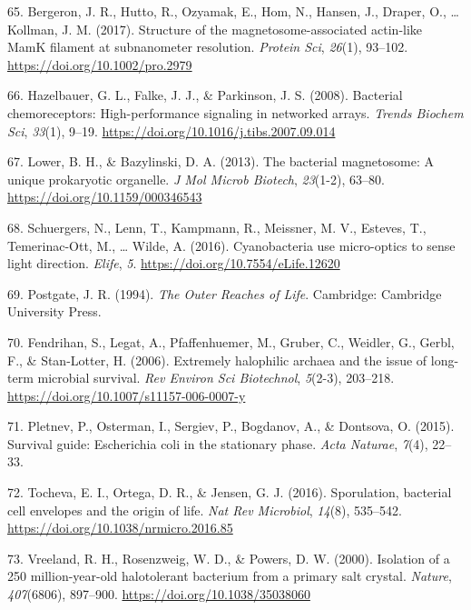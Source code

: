 \documentclass[]{tufte-book}
\begin{document}
\leavevmode\hypertarget{ref-bergeron2017}{}%
65. Bergeron, J. R., Hutto, R., Ozyamak, E., Hom, N., Hansen, J., Draper, O., \ldots{} Kollman, J. M. (2017). Structure of the magnetosome-associated actin-like MamK filament at subnanometer resolution. \emph{Protein Sci}, \emph{26}(1), 93--102. \url{https://doi.org/10.1002/pro.2979}

\leavevmode\hypertarget{ref-hazelbauer2008}{}%
66. Hazelbauer, G. L., Falke, J. J., \& Parkinson, J. S. (2008). Bacterial chemoreceptors: High-performance signaling in networked arrays. \emph{Trends Biochem Sci}, \emph{33}(1), 9--19. \url{https://doi.org/10.1016/j.tibs.2007.09.014}

\leavevmode\hypertarget{ref-lower2013}{}%
67. Lower, B. H., \& Bazylinski, D. A. (2013). The bacterial magnetosome: A unique prokaryotic organelle. \emph{J Mol Microb Biotech}, \emph{23}(1-2), 63--80. \url{https://doi.org/10.1159/000346543}

\leavevmode\hypertarget{ref-schuergers2016}{}%
68. Schuergers, N., Lenn, T., Kampmann, R., Meissner, M. V., Esteves, T., Temerinac-Ott, M., \ldots{} Wilde, A. (2016). Cyanobacteria use micro-optics to sense light direction. \emph{Elife}, \emph{5}. \url{https://doi.org/10.7554/eLife.12620}

\leavevmode\hypertarget{ref-postgate1994}{}%
69. Postgate, J. R. (1994). \emph{The Outer Reaches of Life}. Cambridge: Cambridge University Press.

\leavevmode\hypertarget{ref-fendrihan2006}{}%
70. Fendrihan, S., Legat, A., Pfaffenhuemer, M., Gruber, C., Weidler, G., Gerbl, F., \& Stan-Lotter, H. (2006). Extremely halophilic archaea and the issue of long-term microbial survival. \emph{Rev Environ Sci Biotechnol}, \emph{5}(2-3), 203--218. \url{https://doi.org/10.1007/s11157-006-0007-y}

\leavevmode\hypertarget{ref-pletnev2015}{}%
71. Pletnev, P., Osterman, I., Sergiev, P., Bogdanov, A., \& Dontsova, O. (2015). Survival guide: Escherichia coli in the stationary phase. \emph{Acta Naturae}, \emph{7}(4), 22--33.

\leavevmode\hypertarget{ref-tocheva2016}{}%
72. Tocheva, E. I., Ortega, D. R., \& Jensen, G. J. (2016). Sporulation, bacterial cell envelopes and the origin of life. \emph{Nat Rev Microbiol}, \emph{14}(8), 535--542. \url{https://doi.org/10.1038/nrmicro.2016.85}

\leavevmode\hypertarget{ref-vreeland2000}{}%
73. Vreeland, R. H., Rosenzweig, W. D., \& Powers, D. W. (2000). Isolation of a 250 million-year-old halotolerant bacterium from a primary salt crystal. \emph{Nature}, \emph{407}(6806), 897--900. \url{https://doi.org/10.1038/35038060}
\end{document}
